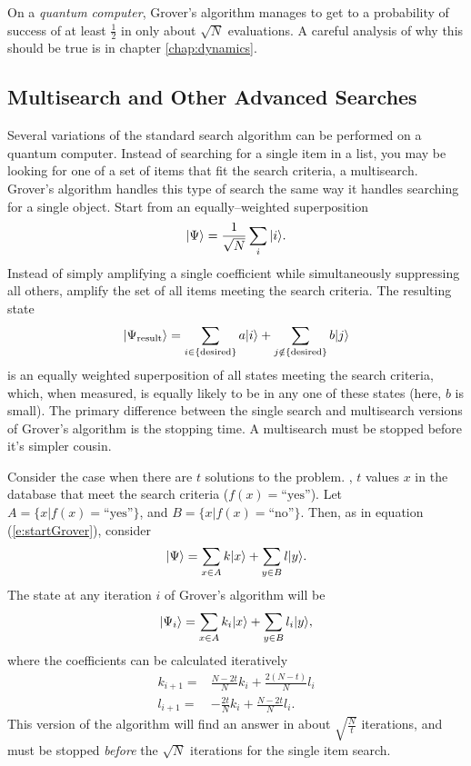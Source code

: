 On a {\sl quantum computer}, Grover's algorithm manages to get 
to a probability of success of at least $\frac{1}{2}$ 
in only about $\sqrt{N}$ evaluations.  
A careful analysis of why this should be true is in
chapter \ref{chap:dynamics}.


\subsection{Multisearch and Other Advanced Searches}

Several variations of the standard search algorithm can 
be performed on a quantum computer.
Instead of searching for
a single item in a list, you may be looking for one of a set of
items that fit the search criteria, a multisearch.
Grover's algorithm handles this type of search the same way it
handles searching for a single object.
Start from an equally--weighted superposition
\begin{equation}
{|{\Psi}\rangle} = \frac{1}{\sqrt{N}}\sum_i{|{i}\rangle}.
\end{equation}
Instead of simply amplifying a single coefficient while simultaneously
suppressing all others, amplify the set of all items meeting the 
search criteria.  
The resulting state 
\begin{equation}
{|{\Psi_{\text{result}}}\rangle} = 
\sum_{i\in\lbrace\text{desired}\rbrace}a{|{i}\rangle}
+ \sum_{j\notin\lbrace\text{desired}\rbrace}b{|{j}\rangle}
\end{equation}
is an equally weighted superposition of all
states meeting the search criteria, which, when measured, is equally 
likely to be in any one of these states (here, $b$ is small).
The primary difference between the single search and multisearch versions of
Grover's algorithm is the stopping time.  A multisearch must be stopped
before it's simpler cousin.

Consider the case when there are $t$ solutions to the problem.  \ie,
$t$ values $x$ in the database that meet the search criteria 
($f(x) = \text{``yes''}$).  Let $A=\lbrace x|f(x)=\text{``yes''}\rbrace$, and
$B=\lbrace x|f(x)=\text{``no''}\rbrace$.  Then,
as in equation (\ref{e:startGrover}), consider
\begin{equation}
{|{\Psi}\rangle} = \sum_{x\in A}k{|{x}\rangle} + \sum_{y\in B}l{|{y}\rangle}.
\end{equation}
The state at any iteration $i$ of Grover's algorithm will be
\begin{equation}
{|{\Psi_i}\rangle} = \sum_{x\in A}k_i{|{x}\rangle} + \sum_{y\in B}l_i{|{y}\rangle},
\end{equation}
where the coefficients can be calculated iteratively 
\begin{equation}
\begin{split}
k_{i+1} =& \frac{N-2t}{N}k_i + \frac{2(N-t)}{N}l_i\\
l_{i+1} =& -\frac{2t}{N}k_i + \frac{N-2t}{N}l_i.
\end{split}
\end{equation}
This version of the algorithm will find an answer in about 
$\sqrt{\frac{N}{t}}$ iterations, and must be stopped {\sl before}
the $\sqrt{N}$ iterations for the single item search.


